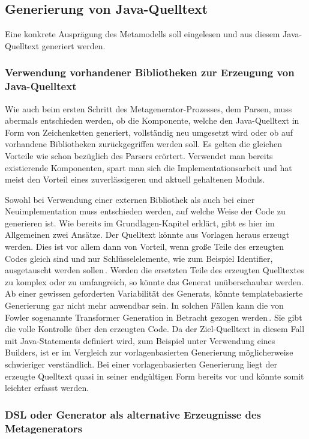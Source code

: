 \documentclass[12pt,oneside,a4paper,parskip]{scrbook}
\begin{document}
\subsection{Generierung von Java-Quelltext}

Eine konkrete Ausprägung des Metamodells soll eingelesen und aus diesem Java-Quelltext generiert werden.

\subsubsection{Verwendung vorhandener Bibliotheken zur Erzeugung von Java-Quelltext}

Wie auch beim ersten Schritt des Metagenerator-Prozesses, dem Parsen, muss abermals entschieden werden, ob die Komponente, welche den Java-Quelltext in Form von Zeichenketten generiert, vollständig neu umgesetzt wird oder ob auf vorhandene Bibliotheken zurückgegriffen werden soll. Es gelten die gleichen Vorteile wie schon bezüglich des Parsers erörtert. Verwendet man bereits existierende Komponenten, spart man sich die Implementationsarbeit und hat meist den Vorteil eines zuverlässigeren und aktuell gehaltenen Moduls.

Sowohl bei Verwendung einer externen Bibliothek als auch bei einer Neuimplementation muss entschieden werden, auf welche Weise der Code zu generieren ist. Wie bereits im Grundlagen-Kapitel erklärt, gibt es hier im Allgemeinen zwei Ansätze. Der Quelltext könnte aus Vorlagen heraus erzeugt werden. Dies ist vor allem dann von Vorteil, wenn große Teile des erzeugten Codes gleich sind und nur Schlüsselelemente, wie zum Beispiel Identifier, ausgetauscht werden sollen\,\cite[S.\,125]{fowler2010}. Werden die ersetzten Teile des erzeugten Quelltextes zu komplex oder zu umfangreich, so könnte das Generat unüberschaubar werden. Ab einer gewissen geforderten Variabilität des Generats, könnte templatebasierte Generierung gar nicht mehr anwendbar sein. In solchen Fällen kann die von Fowler sogenannte Transformer Generation in Betracht gezogen werden\,\cite[S.\,125]{fowler2010}. Sie gibt die volle Kontrolle über den erzeugten Code. Da der Ziel-Quelltext in diesem Fall mit Java-Statements definiert wird, zum Beispiel unter Verwendung eines Builders, ist er im Vergleich zur vorlagenbasierten Generierung möglicherweise schwieriger verständlich. Bei einer vorlagenbasierten Generierung liegt der erzeugte Quelltext quasi in seiner endgültigen Form bereits vor und könnte somit leichter erfasst werden.

\subsubsection{DSL oder Generator als alternative Erzeugnisse des Metagenerators}
\end{document}
